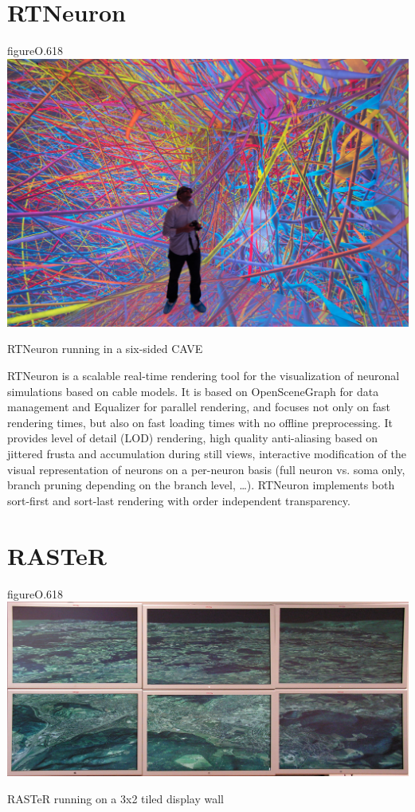 \section{RTNeuron}\label{sRTNeuron}

\begin{wrapfloat}{figure}{O}{.618\textwidth}
  \includegraphics[width=.618\textwidth]{images/RTNeuron}
  {\caption{\label{fRTNeuron}RTNeuron running in a six-sided CAVE}}
\end{wrapfloat}

RTNeuron \cite{HBBES:13} is a scalable real-time rendering tool for the
visualization of neuronal simulations based on cable models. It is based on
OpenSceneGraph for data management and Equalizer for parallel rendering, and
focuses not only on fast rendering times, but also on fast loading times with no
offline preprocessing. It provides level of detail (LOD) rendering, high quality
anti-aliasing based on jittered frusta and accumulation during still views,
interactive modification of the visual representation of neurons on a per-neuron
basis (full neuron vs. soma only, branch pruning depending on the branch level,
\dots). RTNeuron implements both sort-first and sort-last rendering with order
independent transparency.

\section{RASTeR}

\begin{wrapfloat}{figure}{O}{.618\textwidth}
  \includegraphics[width=.618\textwidth]{images/raster}
  {\caption{\label{fRaster}RASTeR running on a 3x2 tiled display wall}}
\end{wrapfloat}

